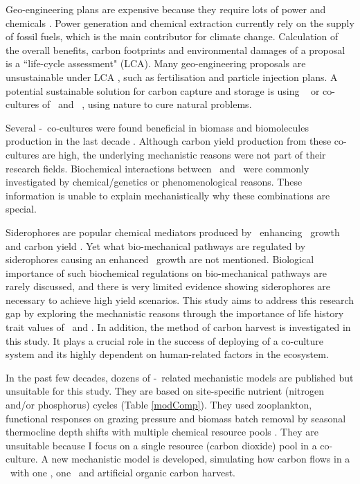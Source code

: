 \documentclass[../thesis.tex]{subfiles} %
\begin{document}
Geo-engineering plans are expensive because they require lots of power and chemicals \autocite{boyd2008ranking,boyd2008implications,mcclellan2012cost}.  Power generation and chemical extraction currently rely on the supply of fossil fuels, which is the main contributor for climate change.  Calculation of the overall benefits, carbon footprints and environmental damages of a proposal is a ``life-cycle assessment" (LCA).  Many geo-engineering proposals are unsustainable under LCA \autocite{abdussalam2020green}, such as fertilisation and particle injection plans.  A potential sustainable solution for carbon capture and storage is using \phy\ \autocite{farrelly2013carbon} or co-cultures of \phy\ and \bac\ \autocite{fuentes2016impact}, using nature to cure natural problems.

Several \phy-\bac\ co-cultures were found beneficial in biomass and biomolecules production in the last decade \autocite{fuentes2016impact,santos2014microalgal}.  Although carbon yield production from these co-cultures are high, the underlying mechanistic reasons were not part of their research fields.  Biochemical interactions between \phy\ and \bac\ were commonly investigated by chemical/genetics \autocite{amin2009photolysis,durham2015cryptic,leyva2014accumulation,rivas2010interactions,seyedsayamdost2011roseobacticides} or phenomenological \autocite{choix2012enhanced1,choix2012enhanced2,kazamia2012mutualistic,santos2014microalgal} reasons.  These information is unable to explain mechanistically why these combinations are special.

Siderophores are popular chemical mediators produced by \bac\ enhancing \phy\ growth and carbon yield \autocite{fuentes2016impact}.  Yet what bio-mechanical pathways are regulated by siderophores causing an enhanced \phy\ growth are not mentioned.  Biological importance of such biochemical regulations on bio-mechanical pathways are rarely discussed, and there is very limited evidence showing siderophores are necessary to achieve high yield scenarios.  This study aims to address this research gap by exploring the mechanistic reasons through the importance of life history trait values of \phy\ and \bac.  In addition, the method of carbon harvest is investigated in this study.  It plays a crucial role in the success of deploying of a co-culture system and its highly dependent on human-related factors in the ecosystem.

In the past few decades, dozens of \phy-\bac\ related mechanistic models are published but unsuitable for this study.  They are based on site-specific nutrient (nitrogen and/or phosphorus) cycles (Table \ref{modComp}).  They used zooplankton, functional responses on grazing pressure and biomass batch removal by seasonal thermocline depth shifts \autocite{anderson2015empower,kidston2013phytoplankton,llebot2010role}
with multiple chemical resource pools \autocite{llebot2010role,mitra2009closure,findlay2006modelling}.  They are unsuitable because I focus on a single resource (carbon dioxide) pool in a co-culture.  A new mechanistic model is developed, simulating how carbon flows in a \pbs\ with one \phy, one \bacm\ and artificial organic carbon harvest.
\end{document}
